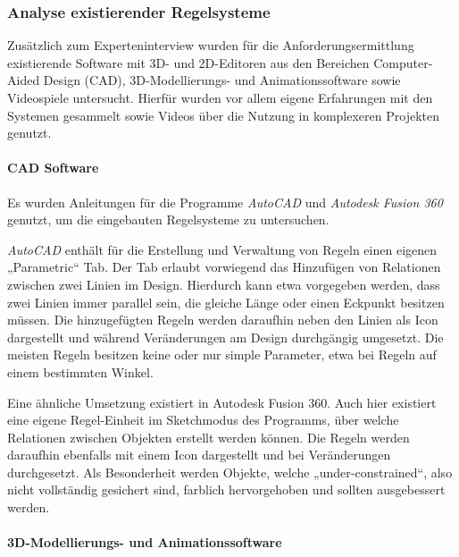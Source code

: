 \subsubsection{Analyse existierender Regelsysteme}\label{subsubsection:Analyse existierender Constraint-Systeme}

Zusätzlich zum Experteninterview wurden für die Anforderungsermittlung existierende Software mit 3D- und 2D-Editoren aus den Bereichen Computer-Aided Design (CAD), 3D-Modellierungs- und Animationssoftware sowie Videospiele untersucht. Hierfür wurden vor allem eigene Erfahrungen mit den Systemen gesammelt sowie Videos über die Nutzung in komplexeren Projekten genutzt.

\paragraph{CAD Software}

Es wurden Anleitungen für die Programme \textit{AutoCAD} und \textit{Autodesk Fusion 360} genutzt, um die eingebauten Regelsysteme zu untersuchen.

\textit{AutoCAD} enthält für die Erstellung und Verwaltung von Regeln einen eigenen „Parametric“ Tab. Der Tab erlaubt vorwiegend das Hinzufügen von Relationen zwischen zwei Linien im Design. Hierdurch kann etwa vorgegeben werden, dass zwei Linien immer parallel sein, die gleiche Länge oder einen Eckpunkt besitzen müssen. Die hinzugefügten Regeln werden daraufhin neben den Linien als Icon dargestellt und während Veränderungen am Design durchgängig umgesetzt. Die meisten Regeln besitzen keine oder nur simple Parameter, etwa bei Regeln auf einem bestimmten Winkel. \parencite{micrographicsConstraintsParametersAutoCAD2021}

Eine ähnliche Umsetzung existiert in Autodesk Fusion 360. Auch hier existiert eine eigene Regel-Einheit im Sketchmodus des Programms, über welche Relationen zwischen Objekten erstellt werden können. Die Regeln werden daraufhin ebenfalls mit einem Icon dargestellt und bei Veränderungen durchgesetzt. Als Besonderheit werden Objekte, welche „under-constrained“, also nicht vollständig gesichert sind, farblich hervorgehoben und sollten ausgebessert werden. \parencite{autodeskfusionSketchConstraintsMade2023}

\paragraph{3D-Modellierungs- und Animationssoftware}

